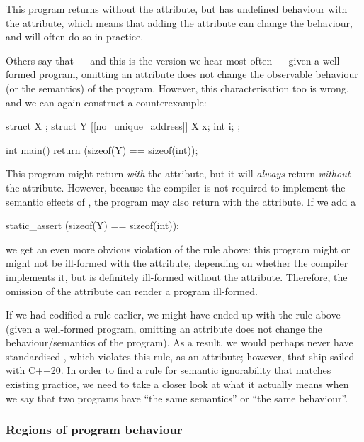 This program returns  without the attribute, but has undefined behaviour with the attribute, which means that adding the attribute can change the behaviour, and will often do so in practice.

Others say that --- and this is the version we hear most often --- given a well-formed program, omitting an attribute does not change the observable behaviour (or the semantics) of the program. However, this characterisation too is wrong, and we can again construct a counterexample:

\begin{codeblock}
struct X {};
struct Y {
  [[no_unique_address]] X x;
  int i; 
};

int main() { return (sizeof(Y) == sizeof(int)); }
\end{codeblock}

This program might return  \emph{with} the attribute, but it will \emph{always} return  \emph{without} the attribute. However, because the compiler is not required to implement the semantic effects of \mbox{}, the program may also return  with the attribute. If we add a

\begin{codeblock}
static_assert (sizeof(Y) == sizeof(int));
\end{codeblock}

we get an even more obvious violation of the rule above: this program might or might not be ill-formed with the attribute, depending on whether the compiler implements it, but is definitely ill-formed without the attribute. Therefore, the omission of the attribute can render a program ill-formed.

If we had codified a rule earlier, we might have ended up with the rule above (given a well-formed program, omitting an attribute does not change the behaviour/semantics of the program). As a result, we would perhaps never have standardised \mbox{}, which violates this rule, as an attribute; however, that ship sailed with C++20.
In order to find a rule for semantic ignorability that matches existing practice, we need to take a closer look at what it actually means when we say that two programs have ``the same semantics'' or ``the same behaviour''.

\subsubsection{Regions of program behaviour}
\label{subsubsec:framework}

